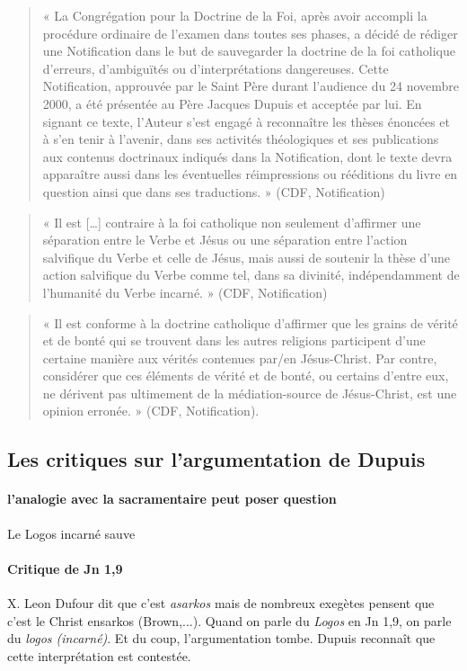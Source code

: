 \begin{quote}
    « La Congrégation pour la Doctrine de la Foi, après avoir accompli la procédure ordinaire de l’examen
dans toutes ses phases, a décidé de rédiger une Notification dans le but de sauvegarder la doctrine de la
foi catholique d’erreurs, d’ambiguïtés ou d’interprétations dangereuses. Cette Notification, approuvée
par le Saint Père durant l’audience du 24 novembre 2000, a été présentée au Père Jacques Dupuis et
acceptée par lui. En signant ce texte, l’Auteur s’est engagé à reconnaître les thèses énoncées et à s’en
tenir à l’avenir, dans ses activités théologiques et ses publications aux contenus doctrinaux indiqués
dans la Notification, dont le texte devra apparaître aussi dans les éventuelles réimpressions ou
rééditions du livre en question ainsi que dans ses traductions. » (CDF, Notification)
\end{quote}
\begin{quote}
« Il est […] contraire à la foi catholique non seulement d’affirmer une séparation entre le Verbe et
Jésus ou une séparation entre l’action salvifique du Verbe et celle de Jésus, mais aussi de soutenir la
thèse d’une action salvifique du Verbe comme tel, dans sa divinité, indépendamment de l’humanité du
Verbe incarné. » (CDF, Notification)
\end{quote}

\begin{quote}
    « Il est conforme à la doctrine catholique d’affirmer que les grains de vérité et de bonté qui se trouvent
dans les autres religions participent d’une certaine manière aux vérités contenues par/en Jésus-Christ.
Par contre, considérer que ces éléments de vérité et de bonté, ou certains d’entre eux, ne dérivent pas
ultimement de la médiation-source de Jésus-Christ, est une opinion erronée. » (CDF, Notification).
\end{quote}

\subsection{Les critiques sur l’argumentation de Dupuis}
\paragraph{l'analogie avec la sacramentaire peut poser question} Le Logos incarné sauve

\paragraph{Critique de Jn 1,9 }
X. Leon Dufour dit que c'est \textit{asarkos} mais de nombreux exegètes pensent que c'est le Christ ensarkos (Brown,...). Quand on parle du \textit{Logos} en Jn 1,9, on parle du \textit{logos (incarné)}. Et du coup, l'argumentation tombe. Dupuis reconnaît que cette interprétation est contestée.

